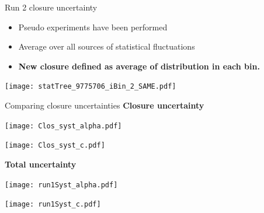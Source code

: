 \begin{frame}{Run 2 closure uncertainty}
  \begin{itemize}
  \item Pseudo experiments have been performed
  \item Average over all sources of statistical fluctuations
  \item {\bf New closure defined as average of distribution in each bin.}
  \end{itemize}
  \centering
  \texttt{[image: statTree\_9775706\_iBin\_2\_SAME.pdf]}
\end{frame}
\begin{frame}{Comparing closure uncertainties}
  \centering
  {\bf Closure uncertainty}\\
  \begin{minipage}{0.42\linewidth}
    \texttt{[image: Clos\_syst\_alpha.pdf]}\\
  \end{minipage}
  \hfill
    \begin{minipage}{0.42\linewidth}
    \texttt{[image: Clos\_syst\_c.pdf]}\\
  \end{minipage}
    \newline
    {\bf Total uncertainty}\\
    \begin{minipage}{0.42\linewidth}
      \texttt{[image: run1Syst\_alpha.pdf]}\\
    \end{minipage}
    \hfill
    \begin{minipage}{0.42\linewidth}
      \texttt{[image: run1Syst\_c.pdf]}\\
    \end{minipage}

\end{frame}
